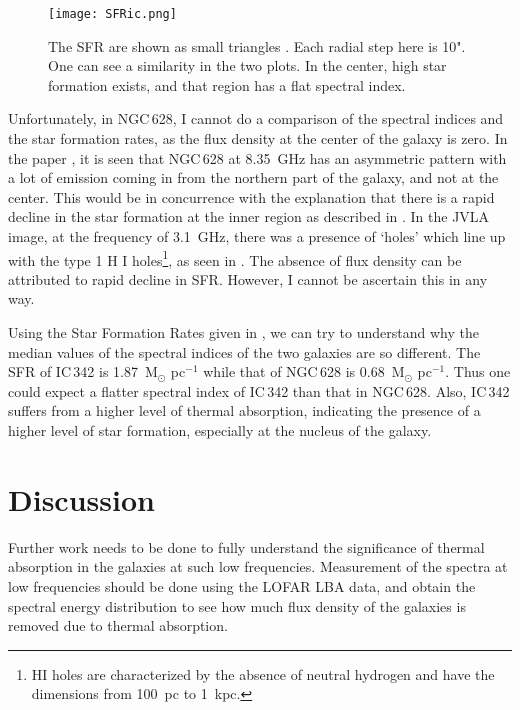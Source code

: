 \documentclass[../main/thesis_msc.tex]{subfiles}
\begin{document}
\begin{figure}
  \centering
    \texttt{[image: SFRic.png]}
  \caption{The SFR are shown as small triangles \citep{2014PASJ...66...27P}. Each radial step here is 10". One can see a similarity in the two plots. In the center, high star formation exists, and that region has a flat spectral index.}\label{sfric342}
\end{figure}

Unfortunately, in NGC\,628, I cannot do a comparison of the spectral indices and the star formation rates, as the flux density at the center of the galaxy is zero. In the paper \citet{2017A&A...600A...6M}, it is seen that NGC\,628 at 8.35~GHz has an asymmetric pattern with a lot of emission coming in from the northern part of the galaxy, and not at the center. This would be in concurrence with the explanation that there is a rapid decline in the star formation at the inner region as described in \citet{2001ApJS..132..129M}. In the JVLA image, at the frequency of 3.1~GHz, there was a presence of `holes' which line up with the type 1 H I holes\footnote{HI holes are characterized by the absence of neutral hydrogen and have the dimensions from 100~pc to 1~kpc.}, as seen in \citet{2011AJ....141...23B}. The absence of flux density can be attributed to rapid decline in SFR. However, I cannot be ascertain this in any way.

Using the Star Formation Rates given in \citet{2011PASP..123.1347K}, we can try to understand why the median values of the spectral indices of the two galaxies are so different. The SFR of IC\,342 is 1.87~M$_{\odot}$ pc$^{-1}$ while that of NGC\,628 is 0.68~M$_{\odot}$ pc$^{-1}$. Thus one could expect a flatter spectral index of IC\,342 than that in NGC\,628. Also, IC\,342 suffers from a higher level of thermal absorption, indicating the presence of a higher level of star formation, especially at the nucleus of the galaxy.

\section{Discussion}
Further work needs to be done to fully understand the significance of thermal absorption in the galaxies at such low frequencies. Measurement of the spectra at low frequencies should be done using the LOFAR LBA data, and obtain the spectral energy distribution to see how much flux density of the galaxies is removed due to thermal absorption. 
\end{document}
